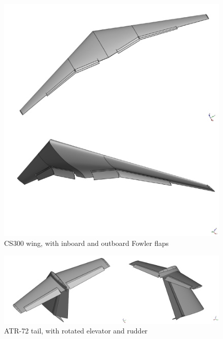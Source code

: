 \begin{figure}[H]
\centering
\includegraphics[scale=0.50]{Immagini/Appendice/Flap/flap_10}
\caption{CS300 wing, with inboard and outboard Fowler flaps}
\label{fig:CS300Fowler}
\end{figure}
%
\begin{figure}[H]
\centering
\includegraphics[scale=0.50]{Immagini/Appendice/Flap/flap_11}
\caption{ATR-72 tail, with rotated elevator and rudder}
\label{fig:TailControlSurfaces}
\end{figure}
%